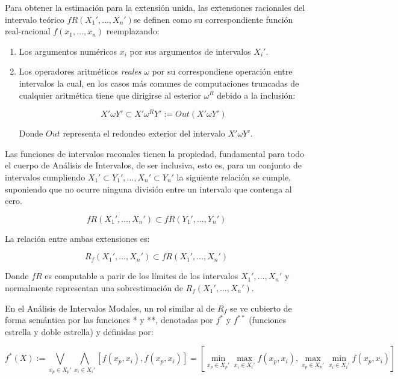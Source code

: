 Para obtener la estimación para la extensión unida, las extensiones racionales del intervalo teórico $fR(X_1', \dotso, X_n')$se definen como su correspondiente función real-racional $f(x_1, \dotso, x_n)$ reemplazando:

\begin{enumerate}
\item Los argumentos numéricos $x_i$ por sus argumentos de intervalos $X_i'$.
\item Los operadores aritméticos{ \em reales} $\omega$ por su correspondiene operación entre intervalos la cual, en los casos más comunes de computaciones truncadas de cualquier aritmética tiene que dirigirse al esterior $\omega^R$ debido a la inclusión:

$$X' \omega Y' \subset X' \omega^R Y' := Out(X' \omega Y')$$

Donde $Out$ representa el redondeo exterior del intervalo $X' \omega Y'$.
\end{enumerate}

Las funciones de intervalos raconales tienen la propiedad, fundamental para todo el cuerpo de Análisis de Intervalos, de ser inclusiva, esto es, para un conjunto de intervalos cumpliendo $X_1' \subset Y_1', \dotso, X_n' \subset Y_n'$ la siguiente relación se cumple, suponiendo que no ocurre  ninguna división entre un intervalo que contenga al cero.

\begin{equation}
f R(X_1', \dotso, X_n') \subset f R(Y_1', \dotso, Y_n')
\nonumber
\end{equation}

La relación entre ambas extensiones es:

\begin{equation}
R_f(X_1', \dotso, X_n') \subset f R(X_1', \dotso, X_n')
\nonumber
\end{equation}

Donde $f R$ es computable a parir de los límites de los intervalos $X_1', \dotso, X_n'$ y normalmente representan una sobrestimación de $R_f(X_1', \dotso, X_n')$.
\par En el Análisis de Intervalos Modales, un rol similar al de $R_f$ se ve cubierto de forma semántica por las funciones * y **, denotadas por $f^*$ y $f^{**}$ (funciones estrella y doble estrella) y definidas por:

\begin{equation}
f^*(X) := \bigvee_{x_p \in X_p'} \bigwedge_{x_i \in X_i'} [f(x_p,x_i),f(x_p,x_i)] = \left[ \min_{x_p \in X_p'} \max_{x_i \in X_i'} f(x_p,x_i), \max_{x_p \in X_p'} \min_{x_i \in X_i'} f(x_p,x_i) \right]
\nonumber
\end{equation}

